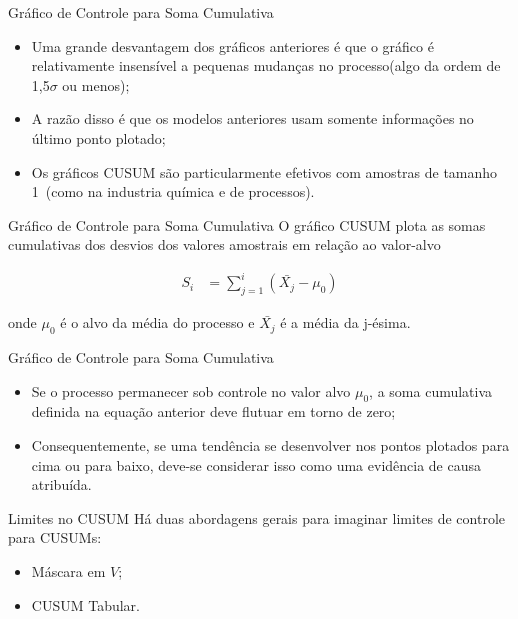 \documentclass[12pt]{beamer}
\begin{document}
  \begin{frame}[t]{Gráfico de Controle para Soma Cumulativa}
    \begin{itemize}
      \item Uma grande desvantagem dos gráficos anteriores é que o gráfico é relativamente insensível a pequenas mudanças no processo(algo da ordem de 1,5$\sigma$ ou menos);

      \item A razão disso é que os modelos anteriores usam somente informações no último ponto plotado;

      \item Os gráficos CUSUM são particularmente efetivos com amostras de tamanho 1~(como na industria química e de processos).
    \end{itemize}
  \end{frame}

  \begin{frame}[t]{Gráfico de Controle para Soma Cumulativa}
    O gráfico CUSUM plota as somas cumulativas dos desvios dos valores amostrais em relação ao valor-alvo

    \begin{align*}
      S_i & = \sum_{j=1}^{i} (\bar{X_{j}} - \mu_{0})
    \end{align*}

    onde $\mu_0$ é o alvo da média do processo e $\bar{X_{j}}$ é a média da j-ésima.
  \end{frame}

  \begin{frame}[t]{Gráfico de Controle para Soma Cumulativa}
    \begin{itemize}
    \item Se o processo permanecer sob controle no valor alvo $\mu_0$, a soma cumulativa definida na equação anterior deve flutuar em torno de zero;

    \item Consequentemente, se uma tendência se desenvolver nos pontos plotados para cima ou para baixo, deve-se considerar isso como uma evidência de causa atribuída.
    \end{itemize}
  \end{frame}

  \begin{frame}[t]{Limites no CUSUM}
    Há duas abordagens gerais para imaginar limites de controle para CUSUMs:

    \begin{itemize}
      \item Máscara em $V$;

      \item CUSUM Tabular.
    \end{itemize}
  \end{frame}
\end{document}
